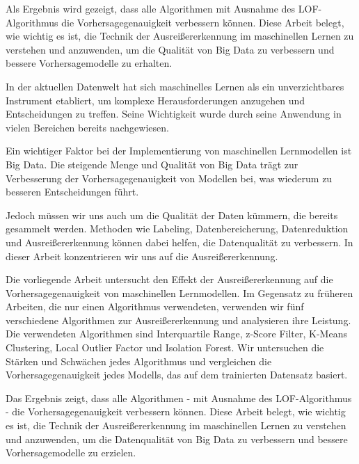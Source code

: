 Als Ergebnis wird gezeigt, dass alle Algorithmen mit Ausnahme des LOF-Algorithmus die Vorhersagegenauigkeit verbessern können. Diese Arbeit belegt, wie wichtig es ist, die Technik der Ausreißererkennung im maschinellen Lernen zu verstehen und anzuwenden, um die Qualität von Big Data zu verbessern und bessere Vorhersagemodelle zu erhalten.





In der aktuellen Datenwelt hat sich maschinelles Lernen als ein unverzichtbares Instrument etabliert, um komplexe Herausforderungen anzugehen und Entscheidungen zu treffen. Seine Wichtigkeit wurde durch seine Anwendung in vielen Bereichen bereits nachgewiesen.

Ein wichtiger Faktor bei der Implementierung von maschinellen Lernmodellen ist Big Data. Die steigende Menge und Qualität von Big Data trägt zur Verbesserung der Vorhersagegenauigkeit von Modellen bei, was wiederum zu besseren Entscheidungen führt.

Jedoch müssen wir uns auch um die Qualität der Daten kümmern, die bereits gesammelt werden. Methoden wie Labeling, Datenbereicherung, Datenreduktion und Ausreißererkennung können dabei helfen, die Datenqualität zu verbessern. In dieser Arbeit konzentrieren wir uns auf die Ausreißererkennung.

Die vorliegende Arbeit untersucht den Effekt der Ausreißererkennung auf die Vorhersagegenauigkeit von maschinellen Lernmodellen. Im Gegensatz zu früheren Arbeiten, die nur einen Algorithmus verwendeten, verwenden wir fünf verschiedene Algorithmen zur Ausreißererkennung und analysieren ihre Leistung. Die verwendeten Algorithmen sind Interquartile Range, z-Score Filter, K-Means Clustering, Local Outlier Factor und Isolation Forest. Wir untersuchen die Stärken und Schwächen jedes Algorithmus und vergleichen die Vorhersagegenauigkeit jedes Modells, das auf dem trainierten Datensatz basiert.

Das Ergebnis zeigt, dass alle Algorithmen - mit Ausnahme des LOF-Algorithmus - die Vorhersagegenauigkeit verbessern können. Diese Arbeit belegt, wie wichtig es ist, die Technik der Ausreißererkennung im maschinellen Lernen zu verstehen und anzuwenden, um die Datenqualität von Big Data zu verbessern und bessere Vorhersagemodelle zu erzielen.

